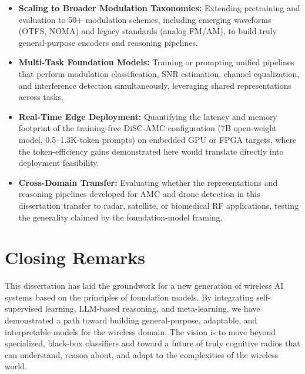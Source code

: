 \begin{itemize}
    \item \textbf{Scaling to Broader Modulation Taxonomies:} Extending pretraining and evaluation to 50+ modulation schemes, including emerging waveforms (OTFS, NOMA) and legacy standards (analog FM/AM), to build truly general-purpose encoders and reasoning pipelines.

    \item \textbf{Multi-Task Foundation Models:} Training or prompting unified pipelines that perform modulation classification, SNR estimation, channel equalization, and interference detection simultaneously, leveraging shared representations across tasks.

    \item \textbf{Real-Time Edge Deployment:} Quantifying the latency and memory footprint of the training-free DiSC-AMC configuration (7B open-weight model, 0.5--1.3K-token prompts) on embedded GPU or FPGA targets, where the token-efficiency gains demonstrated here would translate directly into deployment feasibility.

    \item \textbf{Cross-Domain Transfer:} Evaluating whether the representations and reasoning pipelines developed for AMC and drone detection in this dissertation transfer to radar, satellite, or biomedical RF applications, testing the generality claimed by the foundation-model framing.
\end{itemize}

\section{Closing Remarks}
This dissertation has laid the groundwork for a new generation of wireless AI systems based on the principles of foundation models. By integrating self-supervised learning, LLM-based reasoning, and meta-learning, we have demonstrated a path toward building general-purpose, adaptable, and interpretable models for the wireless domain. The vision is to move beyond specialized, black-box classifiers and toward a future of truly cognitive radios that can understand, reason about, and adapt to the complexities of the wireless world.
